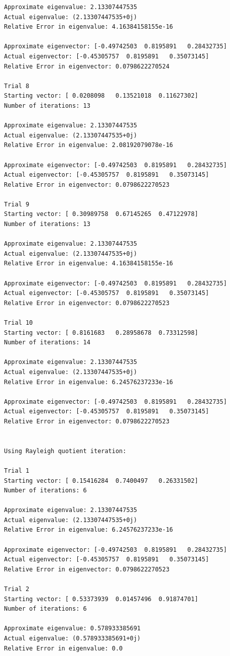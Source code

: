 \documentclass[10pt]{article}
\begin{document}
\begin{itemize}
\begin{verbatim}
Approximate eigenvalue: 2.13307447535
Actual eigenvalue: (2.13307447535+0j)
Relative Error in eigenvalue: 4.16384158155e-16

Approximate eigenvector: [-0.49742503  0.8195891   0.28432735]
Actual eigenvector: [-0.45305757  0.8195891   0.35073145]
Relative Error in eigenvector: 0.0798622270524

Trial 8
Starting vector: [ 0.0208098   0.13521018  0.11627302]
Number of iterations: 13

Approximate eigenvalue: 2.13307447535
Actual eigenvalue: (2.13307447535+0j)
Relative Error in eigenvalue: 2.08192079078e-16

Approximate eigenvector: [-0.49742503  0.8195891   0.28432735]
Actual eigenvector: [-0.45305757  0.8195891   0.35073145]
Relative Error in eigenvector: 0.0798622270523

Trial 9
Starting vector: [ 0.30989758  0.67145265  0.47122978]
Number of iterations: 13

Approximate eigenvalue: 2.13307447535
Actual eigenvalue: (2.13307447535+0j)
Relative Error in eigenvalue: 4.16384158155e-16

Approximate eigenvector: [-0.49742503  0.8195891   0.28432735]
Actual eigenvector: [-0.45305757  0.8195891   0.35073145]
Relative Error in eigenvector: 0.0798622270523

Trial 10
Starting vector: [ 0.8161683   0.28958678  0.73312598]
Number of iterations: 14

Approximate eigenvalue: 2.13307447535
Actual eigenvalue: (2.13307447535+0j)
Relative Error in eigenvalue: 6.24576237233e-16

Approximate eigenvector: [-0.49742503  0.8195891   0.28432735]
Actual eigenvector: [-0.45305757  0.8195891   0.35073145]
Relative Error in eigenvector: 0.0798622270523


Using Rayleigh quotient iteration:

Trial 1
Starting vector: [ 0.15416284  0.7400497   0.26331502]
Number of iterations: 6

Approximate eigenvalue: 2.13307447535
Actual eigenvalue: (2.13307447535+0j)
Relative Error in eigenvalue: 6.24576237233e-16

Approximate eigenvector: [-0.49742503  0.8195891   0.28432735]
Actual eigenvector: [-0.45305757  0.8195891   0.35073145]
Relative Error in eigenvector: 0.0798622270523

Trial 2
Starting vector: [ 0.53373939  0.01457496  0.91874701]
Number of iterations: 6

Approximate eigenvalue: 0.578933385691
Actual eigenvalue: (0.578933385691+0j)
Relative Error in eigenvalue: 0.0


\end{verbatim}
\end{itemize}
\end{document}
